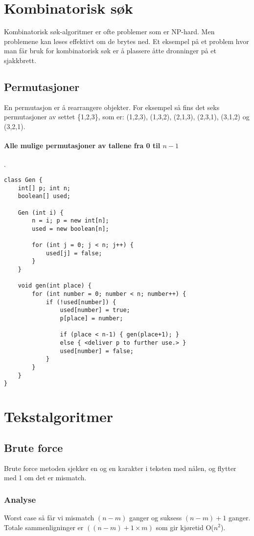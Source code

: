 \documentclass[11pt,a4paper]{article}
\theoremstyle{def}
\begin{document}
\section{Kombinatorisk søk}
Kombinatorisk søk-algoritmer er ofte problemer som er NP-hard. Men problemene kan løses effektivt om de brytes ned. Et eksempel på et problem hvor man får bruk for kombinatorisk søk er å plassere åtte dronninger på et sjakkbrett. 

\subsection{Permutasjoner}
En permutasjon er å rearrangere objekter. For eksempel så fins det seks permutasjoner av settet \{1,2,3\}, som er: (1,2,3), (1,3,2), (2,1,3), (2,3,1), (3,1,2) og (3,2,1).

\paragraph{Alle mulige permutasjoner av tallene fra 0 til $n-1$}.
\begin{lstlisting}[frame=none]
class Gen {
	int[] p; int n;
	boolean[] used;
	
	Gen (int i) {
		n = i; p = new int[n];
		used = new boolean[n];
	
		for (int j = 0; j < n; j++) {
			used[j] = false;
		}
	}

	void gen(int place) {
		for (int number = 0; number < n; number++) {
			if (!used[number]) {
				used[number] = true;
				p[place] = number;
				
				if (place < n-1) { gen(place+1); }
				else { <deliver p to further use.> }
				used[number] = false;
			}
		}
	}
}
\end{lstlisting}
\vspace{-30pt}
\section{Tekstalgoritmer}

\subsection{Brute force}
Brute force metoden sjekker en og en karakter i teksten med nålen, og flytter med 1 om det er mismatch.

\subsubsection{Analyse}
Worst case så får vi mismatch $(n-m)$ ganger og suksess $(n-m)+1$ ganger. Totale sammenligninger er $((n-m)+1 \times m)$ som gir kjøretid O($n^2$).
\end{document}
